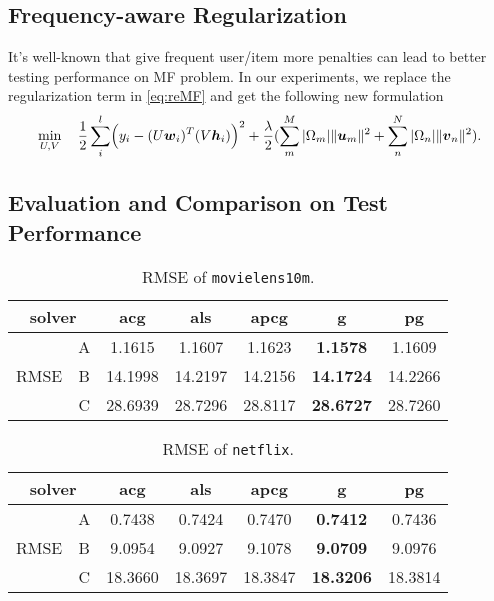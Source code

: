 \documentclass[11pt,twoside]{article}
\newcommand{\bsym}[1]{\ensuremath{\boldsymbol{#1}}}
\newcommand{\bw}{\ensuremath{\bsym{w}}}
\newcommand{\bh}{\ensuremath{\bsym{h}}}
\newcommand{\bu}{\ensuremath{\bsym{u}}}
\newcommand{\bv}{\ensuremath{\bsym{v}}}
\begin{document}
\subsection{Frequency-aware Regularization}
It's well-known that give frequent user/item more penalties can lead to better testing performance on MF problem. In our experiments, we replace the regularization term in \eqref{eq:reMF} and get the following new formulation
\begin{equation}
    \min_{U,V}  \quad \frac{1}{2}\sum_{i}^l  \Bigl(y_i - (U \bw_i)^T (V \bh_i)\Bigr)^2+
    \frac{\lambda}{2} (\sum^{M}_m |\Omega_{m}| \|\bu_m\|^2 +\sum^{N}_{n} |\Omega_{n}| \|\bv_n\|^2).
    \label{eq:faMF}
\end{equation}
\subsection{Evaluation and Comparison on Test Performance}
\begin{table}[H]
\centering
\begin{tabular}{c|c|ccccc}
\multicolumn{2}{c|}{solver} & acg     & als     & apcg    & g                & pg      \\ \hline
\multirow{3}{*}{RMSE}  & A  & 1.1615  & 1.1607  & 1.1623  & \textbf{1.1578}  & 1.1609  \\ \cline{2-7} 
                       & B  & 14.1998 & 14.2197 & 14.2156 & \textbf{14.1724} & 14.2266 \\ \cline{2-7} 
                       & C  & 28.6939 & 28.7296 & 28.8117 & \textbf{28.6727} & 28.7260
\end{tabular}
\caption{RMSE of {\tt movielens10m}.}
    \label{tab:rmse_ml}
\end{table}

\begin{table}[H]
\centering
\begin{tabular}{c|c|ccccc}
\multicolumn{2}{c|}{solver} & acg     & als    & apcg    & g               & pg      \\ \hline
\multirow{3}{*}{RMSE}  & A  & 0.7438  & 0.7424 & 0.7470  & \textbf{0.7412} & 0.7436  \\ \cline{2-7} 
                       & B  & 9.0954  & 9.0927 & 9.1078  & \textbf{9.0709} & 9.0976  \\ \cline{2-7} 
                       & C  & 18.3660 & 18.3697      & 18.3847 & \textbf{18.3206}      & 18.3814
\end{tabular}
\caption{RMSE of {\tt netflix}.}
    \label{tab:rmse_nf}
\end{table}

\clearpage\newpage


%

\clearpage\newpage

\end{document}
